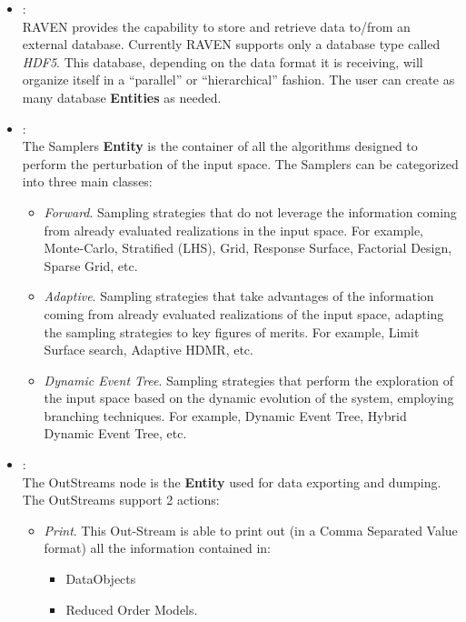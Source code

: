 \begin{itemize}
  \item \textit{}:
      \\ RAVEN provides the capability to store and retrieve data to/from an external database. Currently RAVEN supports
       only a database type called \textit{HDF5}. This database, depending on the data format it is receiving, will
       organize itself in a ``parallel'' or ``hierarchical'' fashion. The user can create as many database \textbf{Entities} as needed.
  \item \textit{}:
  \\ The Samplers  \textbf{Entity} is the container of all the algorithms designed to perform the perturbation of the input space.
      The Samplers can be categorized into three main classes:
      \begin{itemize}
        \item  \textit{Forward}. Sampling strategies that do not leverage the information coming from already evaluated
        realizations in the input space. For example, Monte-Carlo, Stratified (LHS), Grid, Response Surface, Factorial Design,
        Sparse Grid, etc.
        \item  \textit{Adaptive}. Sampling strategies that take advantages of the information coming from already evaluated
        realizations of the input space, adapting the sampling strategies to key figures of merits. For example, Limit Surface
        search, Adaptive HDMR, etc.
        \item \textit{Dynamic Event Tree}. Sampling strategies that perform the exploration of the input space based on the
        dynamic evolution of the system, employing branching techniques. For example, Dynamic Event Tree, Hybrid
        Dynamic Event Tree, etc.
      \end{itemize}
  \item \textit{}:
  \\ The OutStreams node is the \textbf{Entity} used for data exporting and dumping. The OutStreams support
   2 actions:
      \begin{itemize}
       \item \textit{Print}. This Out-Stream is able to print out (in a Comma Separated Value format) all the information
         contained in:
         \begin{itemize}
          \item DataObjects
          \item Reduced Order Models.
         \end{itemize}

\end{itemize}
\end{itemize}
